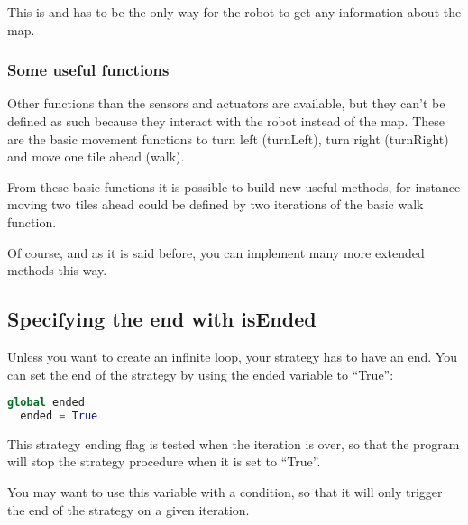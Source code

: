 \documentclass[a4paper,11pt]{article}
\begin{document}
This is and has to be the only way for the robot to get any
information about the map.

\subsubsection{Some useful functions}

Other functions than the sensors and actuators are available, but they
can't be defined as such because they interact with the robot instead
of the map. These are the basic movement functions to turn left
(turnLeft), turn right (turnRight) and move one tile ahead (walk).

From these basic functions it is possible to build new useful methods,
for instance moving two tiles ahead could be defined by two iterations
of the basic walk function.

Of course, and as it is said before, you can implement many more
extended methods this way.

\subsection{Specifying the end with isEnded}

Unless you want to create an infinite loop, your strategy has to have
an end. You can set the end of the strategy by using the ended
variable to ``True'':

\begin{lstlisting}[language=Python]
  global ended
  ended = True
\end{lstlisting}

This strategy ending flag is tested when the iteration is over, so
that the program will stop the strategy procedure when it is set to
``True''.

You may want to use this variable with a condition, so that it will
only trigger the end of the strategy on a given iteration.



\end{document}

